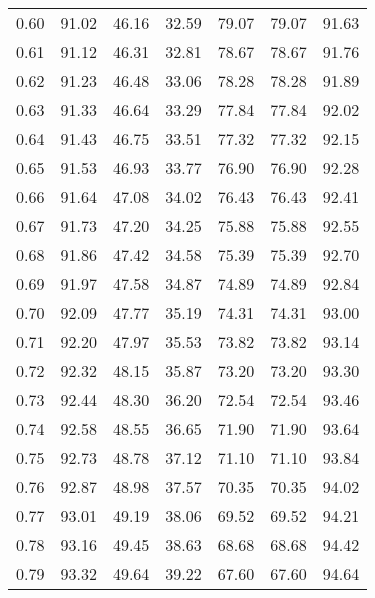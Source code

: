 \begin{tabular}{|c|c|c|c|c|c|c|}
      0.60 &     91.02 &     46.16 &      32.59 &   79.07 &      79.07 &         91.63 \\
      0.61 &     91.12 &     46.31 &      32.81 &   78.67 &      78.67 &         91.76 \\
      0.62 &     91.23 &     46.48 &      33.06 &   78.28 &      78.28 &         91.89 \\
      0.63 &     91.33 &     46.64 &      33.29 &   77.84 &      77.84 &         92.02 \\
      0.64 &     91.43 &     46.75 &      33.51 &   77.32 &      77.32 &         92.15 \\
      0.65 &     91.53 &     46.93 &      33.77 &   76.90 &      76.90 &         92.28 \\
      0.66 &     91.64 &     47.08 &      34.02 &   76.43 &      76.43 &         92.41 \\
      0.67 &     91.73 &     47.20 &      34.25 &   75.88 &      75.88 &         92.55 \\
      0.68 &     91.86 &     47.42 &      34.58 &   75.39 &      75.39 &         92.70 \\
      0.69 &     91.97 &     47.58 &      34.87 &   74.89 &      74.89 &         92.84 \\
      0.70 &     92.09 &     47.77 &      35.19 &   74.31 &      74.31 &         93.00 \\
      0.71 &     92.20 &     47.97 &      35.53 &   73.82 &      73.82 &         93.14 \\
      0.72 &     92.32 &     48.15 &      35.87 &   73.20 &      73.20 &         93.30 \\
      0.73 &     92.44 &     48.30 &      36.20 &   72.54 &      72.54 &         93.46 \\
      0.74 &     92.58 &     48.55 &      36.65 &   71.90 &      71.90 &         93.64 \\
      0.75 &     92.73 &     48.78 &      37.12 &   71.10 &      71.10 &         93.84 \\
      0.76 &     92.87 &     48.98 &      37.57 &   70.35 &      70.35 &         94.02 \\
      0.77 &     93.01 &     49.19 &      38.06 &   69.52 &      69.52 &         94.21 \\
      0.78 &     93.16 &     49.45 &      38.63 &   68.68 &      68.68 &         94.42 \\
      0.79 &     93.32 &     49.64 &      39.22 &   67.60 &      67.60 &         94.64 \\

\end{tabular}
